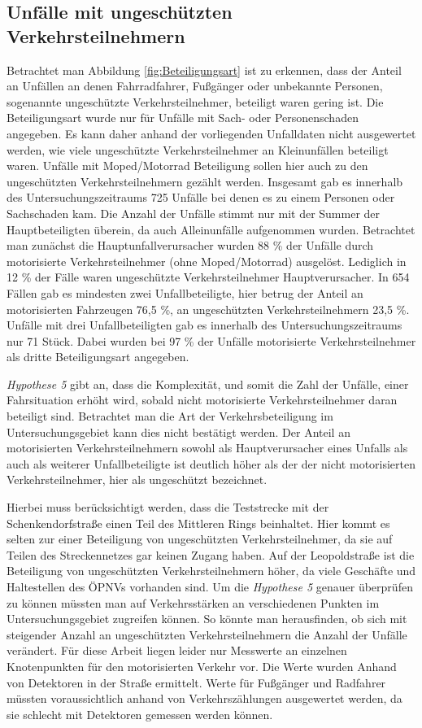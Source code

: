 \subsection{Unfälle mit ungeschützten Verkehrsteilnehmern}
Betrachtet man Abbildung \ref{fig:Beteiligungsart} ist zu erkennen, dass der Anteil an Unfällen an denen Fahrradfahrer, Fußgänger oder unbekannte Personen, sogenannte ungeschützte Verkehrsteilnehmer, beteiligt waren gering ist. Die Beteiligungsart wurde nur für Unfälle mit Sach- oder Personenschaden angegeben. Es kann daher anhand der vorliegenden Unfalldaten nicht ausgewertet werden, wie viele ungeschützte Verkehrsteilnehmer an Kleinunfällen beteiligt waren. Unfälle mit Moped/Motorrad Beteiligung sollen hier auch zu den ungeschützten Verkehrsteilnehmern gezählt werden. Insgesamt gab es innerhalb des Untersuchungszeitraums 725 Unfälle bei denen es zu einem Personen oder Sachschaden kam. Die Anzahl der Unfälle stimmt nur mit der Summer der Hauptbeteiligten überein, da auch Alleinunfälle aufgenommen wurden. Betrachtet man zunächst die Hauptunfallverursacher wurden 88 \% der Unfälle durch motorisierte Verkehrsteilnehmer (ohne Moped/Motorrad) ausgelöst. Lediglich in 12 \% der Fälle waren ungeschützte Verkehrsteilnehmer Hauptverursacher. In 654 Fällen gab es mindesten zwei Unfallbeteiligte, hier betrug der Anteil an motorisierten Fahrzeugen 76,5 \%, an ungeschützten Verkehrsteilnehmern 23,5 \%. Unfälle mit drei Unfallbeteiligten gab es innerhalb des Untersuchungszeitraums nur 71 Stück. Dabei wurden bei 97 \% der Unfälle motorisierte Verkehrsteilnehmer als dritte Beteiligungsart angegeben.

\textit{Hypothese 5} gibt an, dass die Komplexität, und somit die Zahl der Unfälle, einer Fahrsituation erhöht wird, sobald nicht motorisierte Verkehrsteilnehmer daran beteiligt sind. Betrachtet man die Art der Verkehrsbeteiligung im Untersuchungsgebiet kann dies nicht bestätigt werden. Der Anteil an motorisierten Verkehrsteilnehmern sowohl als Hauptverursacher eines Unfalls als auch als weiterer Unfallbeteiligte ist deutlich höher als der der nicht motorisierten Verkehrsteilnehmer, hier als ungeschützt bezeichnet. 

Hierbei muss berücksichtigt werden, dass die Teststrecke mit der Schenkendorfstraße einen Teil des Mittleren Rings beinhaltet. Hier kommt es selten zur einer Beteiligung von ungeschützten Verkehrsteilnehmer, da sie auf Teilen des Streckennetzes gar keinen Zugang haben. Auf der Leopoldstraße ist die Beteiligung von ungeschützten Verkehrsteilnehmern höher, da viele Geschäfte und Haltestellen des ÖPNVs vorhanden sind. Um die \textit{Hypothese 5} genauer überprüfen zu können müssten man auf Verkehrsstärken an verschiedenen Punkten im Untersuchungsgebiet zugreifen können. So könnte man herausfinden, ob sich mit steigender Anzahl an ungeschützten Verkehrsteilnehmern die Anzahl der Unfälle verändert. Für diese Arbeit liegen leider nur Messwerte an einzelnen Knotenpunkten für den motorisierten Verkehr vor. Die Werte wurden Anhand von Detektoren in der Straße ermittelt. Werte für Fußgänger und Radfahrer müssten voraussichtlich anhand von Verkehrszählungen ausgewertet werden, da sie schlecht mit Detektoren gemessen werden können. %

